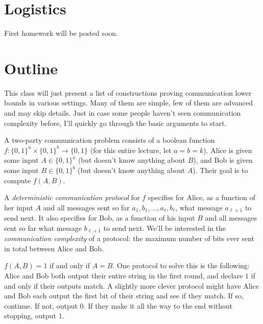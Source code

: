 


\disclaimer 
\section{Logistics}
First homework will be posted soon. 

\section{Outline}
This class will just present a list of constructions proving communication lower bounds in various settings. Many of them are simple, few of them are advanced and may skip details. Just in case some people haven't seen communication complexity before, I'll quickly go through the basic arguments to start.

\begin{definition} A two-party communication problem consists of a boolean function $f:\{0,1\}^a \times \{0,1\}^b \rightarrow \{0,1\}$ (for this entire lecture, let $a = b = k$). Alice is given some input $A \in \{0,1\}^a$ (but doesn't know anything about $B$), and Bob is given some input $B \in \{0,1\}^b$ (but doesn't know anything about $A$). Their goal is to compute $f(A, B)$. 
\end{definition}
\begin{definition} A \emph{deterministic communication protocol} for $f$ specifies for Alice, as a function of her input $A$ and all messages sent so far $a_1, b_1,\ldots, a_\ell, b_\ell$, what message $a_{\ell+1}$ to send next. It also specifies for Bob, as a function of his input $B$ and all messages sent so far what message $b_{\ell+1}$ to send next. We'll be interested in the \emph{communication complexity} of a protocol: the maximum number of bits ever sent in total between Alice and Bob. 
\end{definition}

\begin{Exa}[Equality] $f(A, B) = 1$ if and only if $A = B$. One protocol to solve this is the following: Alice and Bob both output their entire string in the first round, and declare $1$ if and only if their outputs match. A slightly more clever protocol might have Alice and Bob each output the first bit of their string and see if they match. If so, continue. If not, output $0$. If they make it all the way to the end without stopping, output $1$.
\end{Exa}

